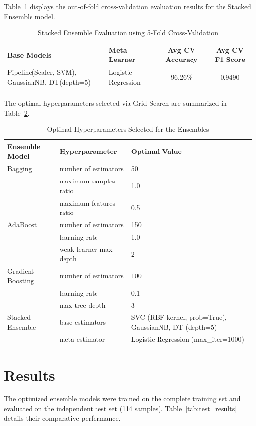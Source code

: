\documentclass[12pt,a4paper]{article}
\begin{document}
Table~\ref{tab:stacking_tuning} displays the out-of-fold cross-validation evaluation results for the Stacked Ensemble model.

\begin{longtable}{|p{6cm}|p{3.5cm}|c|c|}
\hline
\textbf{Base Models} & \textbf{Meta Learner} & \textbf{Avg CV Accuracy} & \textbf{Avg CV F1 Score} \\ \hline
\endhead
Pipeline(Scaler, SVM), GaussianNB, DT(depth=5) & Logistic Regression & 96.26\% & 0.9490 \\ \hline
\caption{Stacked Ensemble Evaluation using 5-Fold Cross-Validation}
\label{tab:stacking_tuning}
\end{longtable}

The optimal hyperparameters selected via Grid Search are summarized in Table~\ref{tab:best_params}.

\begin{table}[H]
\centering
\caption{Optimal Hyperparameters Selected for the Ensembles}
\label{tab:best_params}
\vspace{0.2cm}
\begin{tabular}{lll}
\toprule
\textbf{Ensemble Model} & \textbf{Hyperparameter} & \textbf{Optimal Value} \\
\midrule
Bagging & number of estimators & 50 \\
        & maximum samples ratio & 1.0 \\
        & maximum features ratio & 0.5 \\
\midrule
AdaBoost & number of estimators & 150 \\
         & learning rate & 1.0 \\
         & weak learner max depth & 2 \\
\midrule
Gradient Boosting & number of estimators & 100 \\
                  & learning rate & 0.1 \\
                  & max tree depth & 3 \\
\midrule
Stacked Ensemble  & base estimators & SVC (RBF kernel, prob=True), GaussianNB, DT (depth=5) \\
                  & meta estimator & Logistic Regression (max\_iter=1000) \\
\bottomrule
\end{tabular}
\end{table}

\section{Results}
The optimized ensemble models were trained on the complete training set and evaluated on the independent test set (114 samples). Table~\ref{tab:test_results} details their comparative performance.
\end{document}
